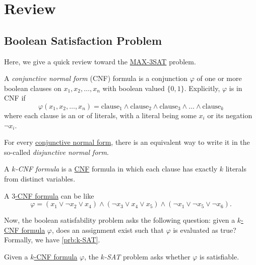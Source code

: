 \chapter{Review}
\section{Boolean Satisfaction Problem}
Here, we give a quick review toward the \hyperref[prb:max-3SAT]{MAX-3SAT} problem.

\begin{definition}\label{def:CNF}
	A \emph{conjunctive normal form} (CNF) formula is a conjunction \(\varphi\) of one or more boolean clauses on \(x_1, x_2, \ldots  , x_n\) with boolean valued \(\{0, 1\}\). Explicitly, \(\varphi\) is in CNF if
	\[
		\varphi(x_1, x_2, \ldots, x_n) = \text{clause}_1 \wedge \text{clause}_2 \wedge \text{clause}_3 \wedge \ldots  \wedge \text{clause}_k
	\]
	where each clause is an or of literals, with a literal being some \(x_i\) or its negation \(\neg x_i\).
\end{definition}

\begin{note}
	For every \hyperref[def:CNF]{conjunctive normal form}, there is an equivalent way to write it in the so-called \emph{disjunctive normal form}.
\end{note}

\begin{definition}[\(k\)-CNF]\label{def:k-CNF}
	A \emph{\(k\)-CNF formula} is a \hyperref[def:CNF]{CNF} formula in which each clause has exactly \(k\) literals from distinct variables.
\end{definition}

\begin{eg}[3-CNF]
	A \hyperref[def:k-CNF]{\(3\)-CNF formula} can be like
	\[
		\varphi = (x_1 \vee \neg x_2 \vee x_4) \wedge (\neg x_3 \vee x_4 \vee x_5) \wedge (\neg x_1 \vee \neg x_5 \vee \neg x_6).
	\]
\end{eg}

Now, the boolean satisfability problem asks the following question: given a \hyperref[def:k-CNF]{\(k\)-CNF formula} \(\varphi \), does an assignment exist such that \(\varphi \) is evaluated as true? Formally, we have \autoref{prb:k-SAT}.

\begin{problem}[\(k\)-SAT]\label{prb:k-SAT}
Given a \hyperref[def:k-CNF]{\(k\)-CNF formula} \(\varphi\), the \emph{\(k\)-SAT} problem asks whether \(\varphi\) is satisfiable.
\end{problem}

